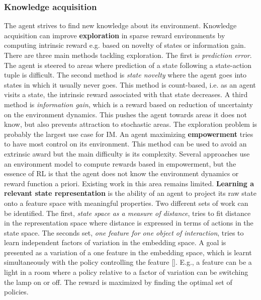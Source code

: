 \documentclass[conference]{IEEEtran}
\begin{document}
\subsubsection{Knowledge acquisition} \label{subsubsec:knowledge_acquisition}
The agent strives to find new knowledge about its environment. Knowledge acquisition can improve \textbf{exploration} in sparse reward environments by computing intrinsic reward e.g. based on novelty of states or information gain. There are three main methods tackling exploration. The first is \textit{prediction error}. The agent is steered to areas where prediction of a state following a state-action tuple is difficult. The second method is \textit{state novelty} where the agent goes into states in which it usually never goes. This method is count-based, i.e. as an agent visits  a state, the intrinsic reward associated with that state decreases. A third method is \textit{information gain}, which is a reward based on reduction of uncertainty on the environment dynamics. This pushes the agent towards areas it does not know, but also prevents attraction to stochastic areas. The exploration problem is probably the largest use case for IM. An agent maximizing \textbf{empowerment} tries to have most control on its environment. This method can be used to avoid an extrinsic award but the main difficulty is its complexity. Several approaches use an environment model to compute rewards based in empowerment, but the essence of RL is that the agent does not know the environment dynamics or reward function a priori. Existing work in this area remains limited. \textbf{Learning a relevant state representation} is the ability of an agent to project its raw state  onto a feature space with meaningful properties. Two different sets of work can be identified. The first, \textit{state space as a measure of distance}, tries to fit distance in the representation space where distance is expressed in terms of actions in the state space. The seconds set, \textit{one feature for one object of interaction}, tries to learn independent factors of variation in the embedding space. A goal is presented as a variation of a one feature in the embedding space, which is learnt simultaneously with the policy controlling the feature [\cite{thomas2017independently}]. E.g., a feature can be a light in a room where a policy relative to a factor of variation can be switching the lamp on or off. The reward is maximized by finding the optimal set of policies.
\end{document}
